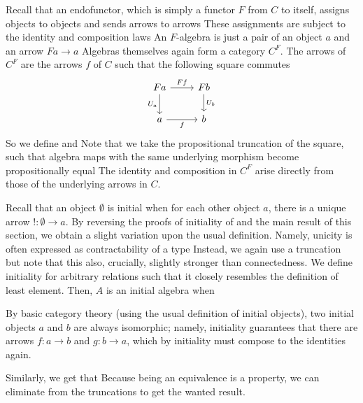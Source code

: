 Recall that an endofunctor, which is simply a functor $F$ from $C$ to itself, assigns objects to objects and sends arrows to arrows
These assignments are subject to the identity and composition laws
An $F$-algebra is just a pair of an object $a$ and an arrow $Fa \to a$
Algebras themselves again form a category $C^F$. The arrows of $C^F$ are the arrows $f$ of $C$ such that the following square commutes%
\[\begin{tikzcd}[ampersand replacement=\&]
	Fa \& Fb \\
	a \& b
	\arrow["f"', from=2-1, to=2-2]
	\arrow["{U_a}"', from=1-1, to=2-1]
	\arrow["{U_b}", from=1-2, to=2-2]
	\arrow["Ff", from=1-1, to=1-2]
\end{tikzcd}\]
So we define
and
Note that we take the propositional truncation of the square, such that algebra maps with the same underlying morphism become propositionally equal
The identity and composition in $C^F$ arise directly from those of the underlying arrows in $C$.

Recall that an object $\emptyset$ is initial when for each other object $a$, there is a unique arrow $!: \emptyset \to a$. By reversing the proofs of initiality of  and the main result of this section, we obtain a slight variation upon the usual definition. Namely, unicity is often expressed as contractability of a type
Instead, we again use a truncation
but note that this also, crucially, slightly stronger than connectedness. We define initiality for arbitrary relations
such that it closely resembles the definition of least element. Then, $A$ is an initial algebra when

By basic category theory (using the usual definition of initial objects), two initial objects $a$ and $b$ are always isomorphic;
namely, initiality guarantees that there are arrows $f : a \to b$ and $g : b \to a$, which by initiality must compose to the identities again.

Similarly, we get that
Because being an equivalence is a property, we can eliminate from the truncations to get the wanted result.

